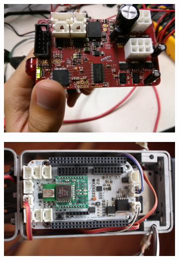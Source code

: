 \begin{figure}[thpb]
\centering
\begin{subfigure}{.3\textwidth}
      \centering
      \includegraphics[width=\columnwidth]{tex/img/motor_board}
      \caption{}
      \label{fig:motor_board}
\end{subfigure}
\begin{subfigure}{.3\textwidth}
      \centering
      \includegraphics[width=\columnwidth]{tex/img/sensor_board_new}
      \caption{}
      \label{fig:sensor_board}
\end{subfigure}
\begin{subfigure}{.3\textwidth}
      \centering

\end{subfigure}
\end{figure}
